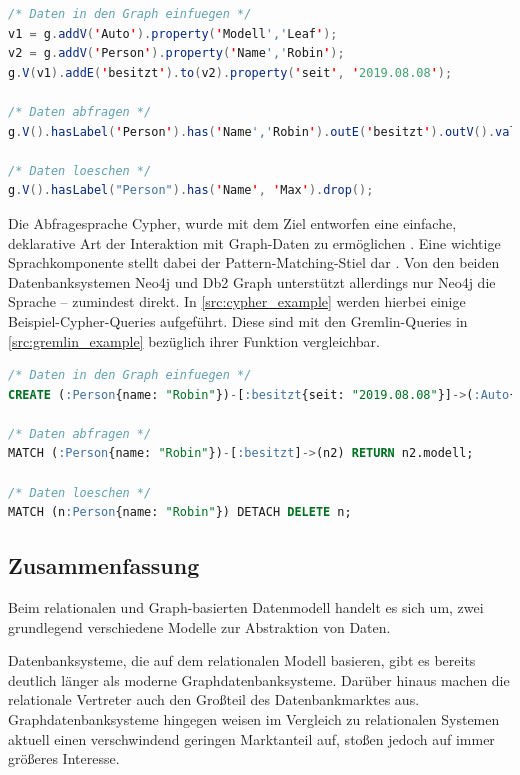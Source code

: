 \begin{lstlisting}[caption={Beispiel Gremlin-Queries},language=JAVA,label=src:gremlin_example]
/* Daten in den Graph einfuegen */
v1 = g.addV('Auto').property('Modell','Leaf');
v2 = g.addV('Person').property('Name','Robin');
g.V(v1).addE('besitzt').to(v2).property('seit', '2019.08.08');

/* Daten abfragen */
g.V().hasLabel('Person').has('Name','Robin').outE('besitzt').outV().values('Modell')

/* Daten loeschen */
g.V().hasLabel("Person").has('Name', 'Max').drop();
\end{lstlisting}

Die Abfragesprache Cypher, wurde mit dem Ziel entworfen eine einfache, deklarative Art der Interaktion mit Graph-Daten zu ermöglichen \cite{gdbms}. Eine wichtige Sprachkomponente stellt dabei der Pattern-Matching-Stiel dar \cite{gdbms}. Von den beiden Datenbanksystemen Neo4j und Db2 Graph unterstützt allerdings nur Neo4j die Sprache -- zumindest direkt. In \autoref{src:cypher_example} werden hierbei einige Beispiel-Cypher-Queries aufgeführt. Diese sind mit den Gremlin-Queries in \autoref{src:gremlin_example} bezüglich ihrer Funktion vergleichbar. 

\begin{lstlisting}[caption={Beispiel Cypher-Queries},language=SQL,label=src:cypher_example]
/* Daten in den Graph einfuegen */
CREATE (:Person{name: "Robin"})-[:besitzt{seit: "2019.08.08"}]->(:Auto{modell: "Leaf"});

/* Daten abfragen */
MATCH (:Person{name: "Robin"})-[:besitzt]->(n2) RETURN n2.modell;

/* Daten loeschen */
MATCH (n:Person{name: "Robin"}) DETACH DELETE n;
\end{lstlisting}

\subsection{Zusammenfassung}

Beim relationalen und Graph-basierten Datenmodell handelt es sich um, zwei grundlegend verschiedene Modelle zur Abstraktion von Daten.

Datenbanksysteme, die auf dem relationalen Modell basieren, gibt es bereits deutlich länger als moderne Graph\-daten\-bank\-systeme. Darüber hinaus machen die relationale Vertreter auch den Großteil des Datenbankmarktes aus. Graphdatenbanksysteme hingegen weisen im Vergleich zu relationalen Systemen aktuell einen verschwindend geringen Marktanteil auf, stoßen jedoch auf immer größeres Interesse. 


